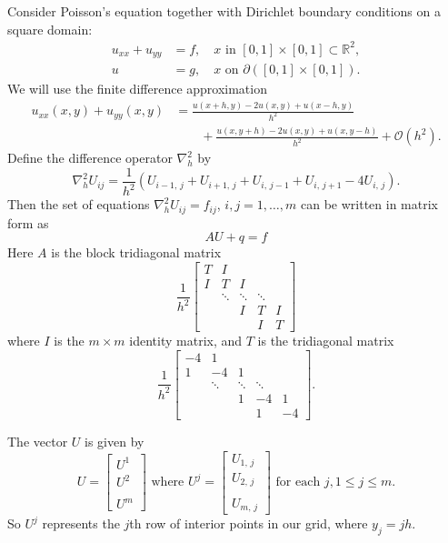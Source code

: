 Consider Poisson's equation together with Dirichlet boundary conditions on a square domain:
\begin{align*}
	u_{xx} + u_{yy} &= f,\quad x \text{ in } [0,1]\times[0,1] \subset \mathbb{R}^2,\\
	u &= g, \quad x \text{ on } \partial \left( [0,1]\times[0,1]\right).
\end{align*}
We will use the finite difference approximation
\begin{align*}
u_{xx}(x,y) + u_{yy}(x,y) &= \frac{u(x+h,y) - 2u(x,y)+ u(x-h,y)}{h^2} \\
& \qquad{}+ 
\frac{u(x,y+h) - 2u(x,y)+ u(x,y-h)}{h^2} + \mathcal{O}(h^2).
\end{align*}
Define the difference operator $\nabla^2_h$ by 
\[
\nabla^2_h U_{ij} = \frac{1}{h^2}(U_{i-1,\,j} + U_{i+1,\,j} + U_{i,\,j-1} + U_{i,\,j+1}-4U_{i,\,j}).
\]
Then the set of equations  $\nabla^2_h U_{ij} = f_{ij}$, $i,j = 1,\ldots,m$ can be written in matrix form as
$$AU + q  = f$$
Here $A$ is the block tridiagonal matrix 
\[
\frac{1}{h^2} \begin{bmatrix}T & I & &  &\\ I &T & I & &\\  &\ddots  & \ddots & \ddots & \\  &  & I & T & I \\
 &  &  & I & T
\end{bmatrix}
\]
where $I$ is the $m\times m$ identity matrix, and $T$ is the tridiagonal matrix
\[
\frac{1}{h^2} \begin{bmatrix}-4 & 1 & &  &\\ 1 &-4 & 1 & &\\  &\ddots  & \ddots & \ddots & \\  &  & 1 & -4 & 1 \\
 &  &  & 1 & -4
\end{bmatrix}.
\]

The vector $U$ is given by 
\[
U = \begin{bmatrix} U^1 \\ U^2 \\ \\ U^m \end{bmatrix} \text{ where } U^j = 
\begin{bmatrix} U_{1,\,j} \\ U_{2,\,j} \\ \\ U_{m,\,j} \end{bmatrix} \text{ for each } j, 1\leq j \leq m.
\]
So $U^j$ represents the $j$th row of interior points in our grid, where $y_j = jh.$


